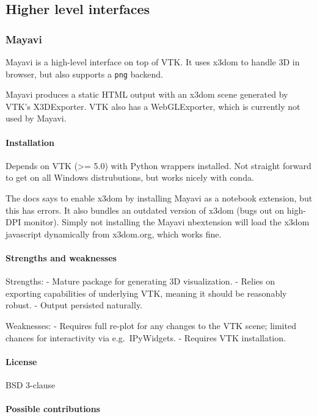 \subsection{Higher level interfaces}

\subsubsection{Mayavi}

Mayavi is a high-level interface on top of VTK. It uses x3dom to handle
3D in browser, but also supports a \texttt{png} backend.

Mayavi produces a static HTML output with an x3dom scene generated by
VTK's X3DExporter. VTK also has a WebGLExporter, which is currently not
used by Mayavi.

\paragraph{Installation}

Depends on VTK (\textgreater{}= 5.0) with Python wrappers installed. Not
straight forward to get on all Windows distrubutions, but works nicely
with conda.

The docs says to enable x3dom by installing Mayavi as a notebook
extension, but this has errors. It also bundles an outdated version of
x3dom (bugs out on high-DPI monitor). Simply not installing the Mayavi
nbextension will load the x3dom javascript dynamically from x3dom.org,
which works fine.

\paragraph{Strengths and weaknesses}

Strengths: - Mature package for generating 3D visualization. - Relies on
exporting capabilities of underlying VTK, meaning it should be
reasonably robust. - Output persisted naturally.

Weaknesses: - Requires full re-plot for any changes to the VTK scene;
limited chances for interactivity via e.g.~IPyWidgets. - Requires VTK
installation.

\paragraph{License}

BSD 3-clause

\paragraph{Possible contributions}

